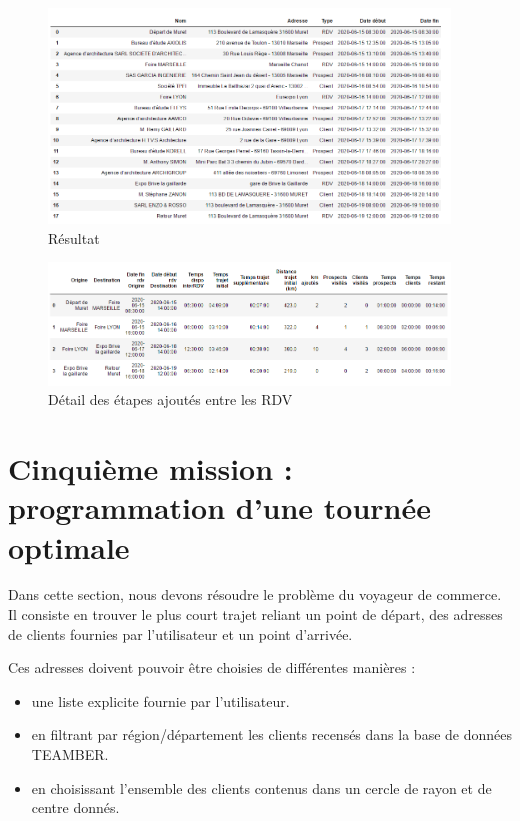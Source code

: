 \documentclass[12pt]{article}
\begin{document}
\begin{figure}[H]
\caption{Résultat}
\begin{center}
\includegraphics[width=0.95\textwidth]{completion programme}
\end{center}
\end{figure}


\begin{figure}[H]
\caption{Détail des étapes ajoutés entre les RDV}
\begin{center}
\includegraphics[width=0.95\textwidth]{interrdv}
\end{center}
\end{figure}




\newpage
\section{Cinquième mission : programmation d'une tournée optimale}
Dans cette section, nous devons résoudre le problème du voyageur de commerce.
Il consiste en trouver le plus court trajet reliant un point de départ, des adresses de clients fournies par l'utilisateur et un point d'arrivée.

Ces adresses doivent pouvoir être choisies de différentes manières :
\begin{itemize}
\item une liste explicite fournie par l'utilisateur.
\item en filtrant par région/département les clients recensés dans la base de données TEAMBER.
\item en choisissant l'ensemble des clients contenus dans un cercle de rayon et de centre donnés.
\end{itemize}
\end{document}
